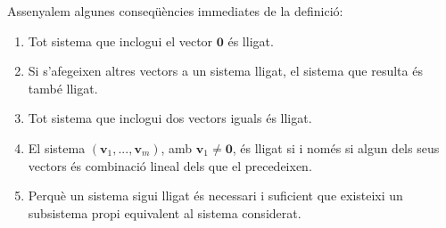 \begin{teorema}
Assenyalem algunes conseqüències immediates de la definició:

\begin{enumerate}
\item Tot sistema que inclogui el vector $\mathbf{0}$ és lligat.

\item Si s'afegeixen altres vectors a un sistema lligat, el sistema que
resulta és també lligat.

\item Tot sistema que inclogui dos vectors iguals és lligat.

\item El sistema $\left( \mathbf{v}_{1},...,\mathbf{v}_{m}\right) $, amb $%
\mathbf{v}_{1}\neq \mathbf{0}$, és lligat si i només si algun dels seus
vectors és combinació lineal dels que el precedeixen.

\item Perquè un sistema sigui lligat és necessari i suficient que existeixi un
subsistema propi equivalent al sistema considerat.
\end{enumerate}

\end{teorema}
